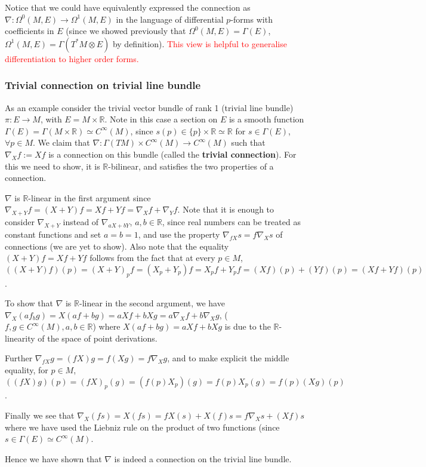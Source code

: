 \documentclass[a4paper]{article}
\theoremstyle{definition} \newtheorem*{definition}{Definition}
\theoremstyle{definition} \newtheorem*{definitions}{Definitions}
\theoremstyle{plain} \newtheorem{theorem}{Theorem}[section]
\theoremstyle{plain} \newtheorem{proposition}[theorem]{Proposition}
\theoremstyle{plain} \newtheorem{corollary}[theorem]{Corollary}
\theoremstyle{plain} \newtheorem{lemma}[theorem]{Lemma}
\theoremstyle{plain} \newtheorem{example}[theorem]{Example}
\newcommand{\checkCorrect}[1]{\textcolor{red}{#1}}
\newcommand{\defn}[1]{\textbf{#1}}
\newcommand{\realnos}{\mathbb{R}}
\newcommand{\smooth}{C^\infty}
\begin{document}
Notice that we could have equivalently expressed the connection as $\nabla:\Omega^0(M, E)\to \Omega^1(M, E)$ in the language of differential $p$-forms with coefficients in $E$ (since we showed previously that $\Omega^0(M, E)=\Gamma(E)$, $\Omega^1(M, E)=\Gamma(T^*M\otimes E)$ by definition).  \checkCorrect{This view is helpful to generalise differentiation to higher order forms.}

\subsubsection{Trivial connection on trivial line bundle}
As an example consider the trivial vector bundle of rank 1 (trivial line bundle)
$\pi:E\to M$, with $E=M\times \realnos$.
Note in this case a section on $E$ is a smooth function $\Gamma(E)=\Gamma(M\times \realnos)\simeq \smooth(M)$, since $s(p)\in \{p\}\times \realnos \simeq \realnos$ for $s\in \Gamma(E)$, $\forall p\in M$.
We claim that $\nabla: \Gamma(TM)\times \smooth(M)\to \smooth(M)$ such that $\nabla_X f := Xf$ is a connection on this bundle (called the \defn{trivial connection}). For this we need to show, it is $\realnos$-bilinear, and satisfies the two properties of a connection. 

$\nabla$ is $\realnos$-linear in the first argument since $\nabla_{X+Y}f=(X+Y)f=Xf+Yf=\nabla_Xf + \nabla_Yf$. Note that it is enough to consider $\nabla_{X+Y}$ instead of $\nabla_{aX+bY}$, $a,b\in \realnos$, since real numbers can be treated as constant functions and set $a=b=1$, and use the property $\nabla_{fX}s=f\nabla_X s$ of connections (we are yet to show). Also note that the equality $(X+Y)f=Xf+Yf$ follows from the fact that at every $p\in M$,
$((X+Y)f)(p)=(X+Y)_pf=(X_p+Y_p)f=X_pf+Y_pf=(Xf)(p)+(Yf)(p)=(Xf+Yf)(p)$.

To show that $\nabla$ is $\realnos$-linear in the second argument, we have $\nabla_X(af_bg)=X(af+bg)=aXf+bXg=a\nabla_Xf + b\nabla_X g$, ($f, g \in \smooth (M), a,b\in \realnos$) where $X(af+bg)=aXf+bXg$ is due to the $\realnos$-linearity of the space of point derivations. 

Further $\nabla_{fX}g=(fX)g=f(Xg)=f\nabla_X g$, and to make explicit the middle equality, for $p\in M$, $((fX)g)(p)=(fX)_p(g)=(f(p)X_p)(g)=f(p)X_p(g)=f(p)(Xg)(p)$.

Finally we see that $\nabla_X(fs)=X(fs)=fX(s)+X(f)s=f\nabla_Xs + (Xf)s$ where we have used the Liebniz rule on the product of two functions (since $s\in \Gamma(E)\simeq \smooth(M)$.

Hence we have shown that $\nabla$ is indeed a connection on the trivial line bundle. 
\end{document}
